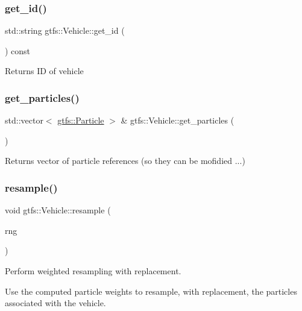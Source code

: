 \subsubsection{\texorpdfstring{get\+\_\+id()}{get\_id()}}
{\footnotesize\ttfamily std\+::string gtfs\+::\+Vehicle\+::get\+\_\+id (\begin{DoxyParamCaption}{ }\end{DoxyParamCaption}) const}

\begin{DoxyReturn}{Returns}
ID of vehicle 
\end{DoxyReturn}
\mbox{\label{classgtfs_1_1Vehicle_a7b12b079c68880f00f532ca25858c368}} 
\subsubsection{\texorpdfstring{get\+\_\+particles()}{get\_particles()}}
{\footnotesize\ttfamily std\+::vector$<$ \hyperlink{classgtfs_1_1Particle}{gtfs\+::\+Particle} $>$ \& gtfs\+::\+Vehicle\+::get\+\_\+particles (\begin{DoxyParamCaption}{ }\end{DoxyParamCaption})}

\begin{DoxyReturn}{Returns}
vector of particle references (so they can be mofidied ...) 
\end{DoxyReturn}
\mbox{\label{classgtfs_1_1Vehicle_a8367fc70a64b7e596422f880dbff1193}} 
\subsubsection{\texorpdfstring{resample()}{resample()}}
{\footnotesize\ttfamily void gtfs\+::\+Vehicle\+::resample (\begin{DoxyParamCaption}\item[{\hyperlink{classsampling_1_1RNG}{sampling\+::\+R\+NG} \&}]{rng }\end{DoxyParamCaption})}

Perform weighted resampling with replacement.

Use the computed particle weights to resample, with replacement, the particles associated with the vehicle. \mbox{\label{classgtfs_1_1Vehicle_add9266d843398c88d3fcc22239f586a9}} 
